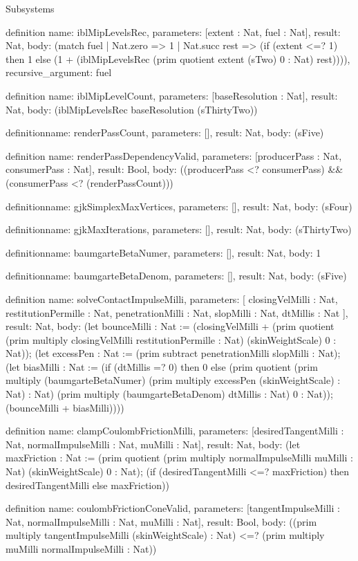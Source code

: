 \begin{lexlean}{Subsystems}
\begin{semanticmodule}
definition{
  name: iblMipLevelsRec,
  parameters: [extent : Nat, fuel : Nat],
  result: Nat,
  body: (match fuel
    | Nat.zero => 1
    | Nat.succ rest => (if (extent <=? 1) then 1 else (1 + (iblMipLevelsRec (prim quotient extent (sTwo) 0 : Nat) rest)))),
  recursive_argument: fuel
}

definition{
  name: iblMipLevelCount,
  parameters: [baseResolution : Nat],
  result: Nat,
  body: (iblMipLevelsRec baseResolution (sThirtyTwo))
}

definition{name: renderPassCount, parameters: [], result: Nat, body: (sFive)}

definition{
  name: renderPassDependencyValid,
  parameters: [producerPass : Nat, consumerPass : Nat],
  result: Bool,
  body: ((producerPass <? consumerPass) && (consumerPass <? (renderPassCount)))
}

definition{name: gjkSimplexMaxVertices, parameters: [], result: Nat, body: (sFour)}

definition{name: gjkMaxIterations, parameters: [], result: Nat, body: (sThirtyTwo)}

definition{name: baumgarteBetaNumer, parameters: [], result: Nat, body: 1}

definition{name: baumgarteBetaDenom, parameters: [], result: Nat, body: (sFive)}

definition{
  name: solveContactImpulseMilli,
  parameters: [
    closingVelMilli : Nat,
    restitutionPermille : Nat,
    penetrationMilli : Nat,
    slopMilli : Nat,
    dtMillis : Nat
  ],
  result: Nat,
  body: (let bounceMilli : Nat := (closingVelMilli + (prim quotient (prim multiply closingVelMilli restitutionPermille : Nat) (skinWeightScale) 0 : Nat)); (let excessPen : Nat := (prim subtract penetrationMilli slopMilli : Nat); (let biasMilli : Nat := (if (dtMillis =? 0) then 0 else (prim quotient (prim multiply (baumgarteBetaNumer) (prim multiply excessPen (skinWeightScale) : Nat) : Nat) (prim multiply (baumgarteBetaDenom) dtMillis : Nat) 0 : Nat)); (bounceMilli + biasMilli))))
}

definition{
  name: clampCoulombFrictionMilli,
  parameters: [desiredTangentMilli : Nat, normalImpulseMilli : Nat, muMilli : Nat],
  result: Nat,
  body: (let maxFriction : Nat := (prim quotient (prim multiply normalImpulseMilli muMilli : Nat) (skinWeightScale) 0 : Nat); (if (desiredTangentMilli <=? maxFriction) then desiredTangentMilli else maxFriction))
}

definition{
  name: coulombFrictionConeValid,
  parameters: [tangentImpulseMilli : Nat, normalImpulseMilli : Nat, muMilli : Nat],
  result: Bool,
  body: ((prim multiply tangentImpulseMilli (skinWeightScale) : Nat) <=? (prim multiply muMilli normalImpulseMilli : Nat))
}


\end{semanticmodule}
\end{lexlean}
